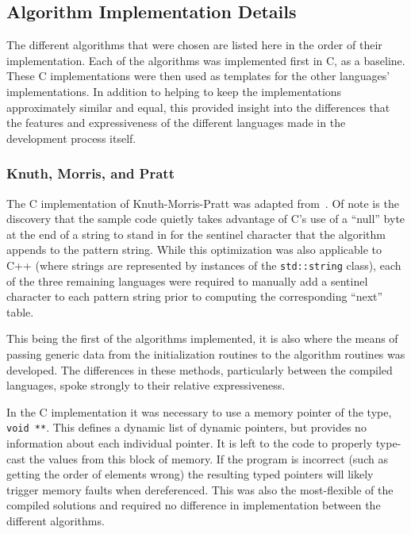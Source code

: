 \subsection{Algorithm Implementation Details}

The different algorithms that were chosen are listed here in the order of their implementation. Each of the algorithms was implemented first in C, as a baseline. These C implementations were then used as templates for the other languages' implementations. In addition to helping to keep the implementations approximately similar and equal, this provided insight into the differences that the features and expressiveness of the different languages made in the development process itself.

\subsubsection{Knuth, Morris, and Pratt}

The C implementation of Knuth-Morris-Pratt was adapted from~\cite[Chapter 7]{handbook.2004}. Of note is the discovery that the sample code quietly takes advantage of C's use of a ``null'' byte at the end of a string to stand in for the sentinel character that the algorithm appends to the pattern string. While this optimization was also applicable to C++ (where strings are represented by instances of the \texttt{std::string} class), each of the three remaining languages were required to manually add a sentinel character to each pattern string prior to computing the corresponding ``next'' table.

This being the first of the algorithms implemented, it is also where the means of passing generic data from the initialization routines to the algorithm routines was developed. The differences in these methods, particularly between the compiled languages, spoke strongly to their relative expressiveness.

In the C implementation it was necessary to use a memory pointer of the type, \texttt{void **}. This defines a dynamic list of dynamic pointers, but provides no information about each individual pointer. It is left to the code to properly type-cast the values from this block of memory. If the program is incorrect (such as getting the order of elements wrong) the resulting typed pointers will likely trigger memory faults when dereferenced. This was also the most-flexible of the compiled solutions and required no difference in implementation between the different algorithms.

